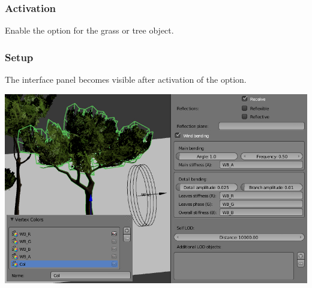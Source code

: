 \documentclass[a4paper,12pt,oneside]{sphinxmanual}
\begin{document}
\subsubsection{Activation}
\label{outdoor_rendering:id34}
Enable the  option for the grass or tree object.


\subsubsection{Setup}
\label{outdoor_rendering:id35}
The interface panel becomes visible after activation of the  option.

{\hfill\includegraphics[width=1.000\linewidth]{wind_bending_setup.jpg}\hfill}
\end{document}
